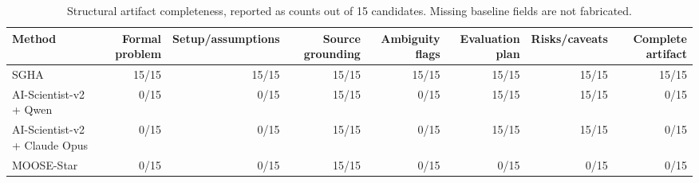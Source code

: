 \begin{table}[htbp]
\centering
\caption{Structural artifact completeness, reported as counts out of 15 candidates. Missing baseline fields are not fabricated.}
\label{tab:structural\_artifacts}
\begin{tabular}{lrrrrrrr}
\toprule
Method & Formal problem & Setup/assumptions & Source grounding & Ambiguity flags & Evaluation plan & Risks/caveats & Complete artifact \\
\midrule
SGHA & 15/15 & 15/15 & 15/15 & 15/15 & 15/15 & 15/15 & 15/15 \\
AI-Scientist-v2 + Qwen & 0/15 & 0/15 & 15/15 & 0/15 & 15/15 & 15/15 & 0/15 \\
AI-Scientist-v2 + Claude Opus & 0/15 & 0/15 & 15/15 & 0/15 & 15/15 & 15/15 & 0/15 \\
MOOSE-Star & 0/15 & 0/15 & 15/15 & 0/15 & 0/15 & 0/15 & 0/15 \\
\bottomrule
\end{tabular}
\end{table}
